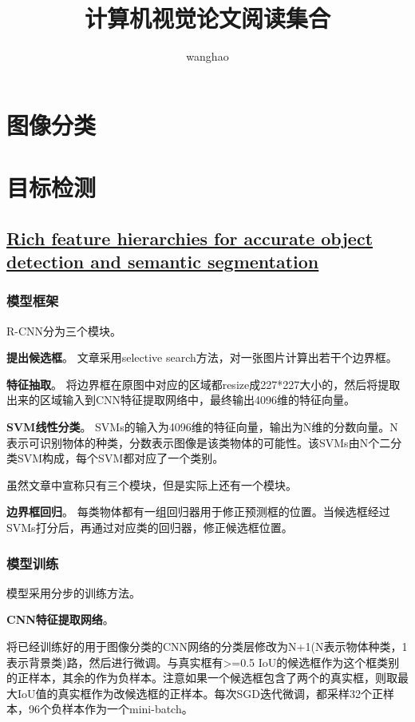 \documentclass[]{article}
\title{计算机视觉论文阅读集合}
\author{wanghao}
\begin{document}
\maketitle
\tableofcontents
\newpage
\hypersetup{hidelinks}

\section{图像分类}
\section{目标检测}
\subsection{\href{./papers/Rich feature hierarchies for accurate object detection and semantic segmentation.pdf}{Rich feature hierarchies for accurate object detection and semantic segmentation}}

\subsubsection{模型框架}
R-CNN分为三个模块。

\textbf{提出候选框}。 
文章采用selective search方法，对一张图片计算出若干个边界框。

\textbf{特征抽取}。 
将边界框在原图中对应的区域都resize成227*227大小的，然后将提取出来的区域输入到CNN特征提取网络中，最终输出4096维的特征向量。

\textbf{SVM线性分类}。
SVMs的输入为4096维的特征向量，输出为N维的分数向量。N表示可识别物体的种类，分数表示图像是该类物体的可能性。该SVMs由N个二分类SVM构成，每个SVM都对应了一个类别。

虽然文章中宣称只有三个模块，但是实际上还有一个模块。

\textbf{边界框回归}。
每类物体都有一组回归器用于修正预测框的位置。当候选框经过SVMs打分后，再通过对应类的回归器，修正候选框位置。

\subsubsection{模型训练}

模型采用分步的训练方法。

\textbf{CNN特征提取网络}。

将已经训练好的用于图像分类的CNN网络的分类层修改为N+1(N表示物体种类，1表示背景类)路，然后进行微调。与真实框有>=0.5 IoU的候选框作为这个框类别的正样本，其余的作为负样本。注意如果一个候选框包含了两个的真实框，则取最大IoU值的真实框作为改候选框的正样本。每次SGD迭代微调，都采样32个正样本，96个负样本作为一个mini-batch。
\end{document}
